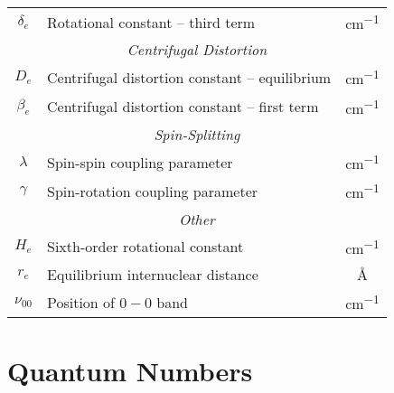 \documentclass[11pt, twoside, fleqn]{report}
\newcommand{\dash}{\!-\!}
\begin{document}
\begin{table}[H]
\begin{tabular}{clc}
            $\delta_{e}$      & Rotational constant -- third term                                            & \unit{cm^{-1}}   \\
            \multicolumn{3}{c}{\textit{Centrifugal Distortion}}                                                                 \\
            \cmidrule(lr){1-3}
            $D_{e}$           & Centrifugal distortion constant -- equilibrium                               & \unit{cm^{-1}}   \\
            $\beta_{e}$       & Centrifugal distortion constant -- first term                                & \unit{cm^{-1}}   \\
            \multicolumn{3}{c}{\textit{Spin-Splitting}}                                                                         \\
            \cmidrule(lr){1-3}
            $\lambda$         & Spin-spin coupling parameter                                                 & \unit{cm^{-1}}   \\
            $\gamma$          & Spin-rotation coupling parameter                                             & \unit{cm^{-1}}   \\
            \multicolumn{3}{c}{\textit{Other}}                                                                                  \\
            \cmidrule(lr){1-3}
            $H_{e}$           & Sixth-order rotational constant                                              & \unit{cm^{-1}}   \\
            $r_{e}$           & Equilibrium internuclear distance                                            & \unit{\angstrom} \\
            $\nu_{00}$        & Position of $0\dash0$ band                                                   & \unit{cm^{-1}}   \\
            \bottomrule
        \end{tabular}
    \end{table}

    \chapter{Quantum Numbers}
    \label{a:quantum_numbers}
\end{document}

